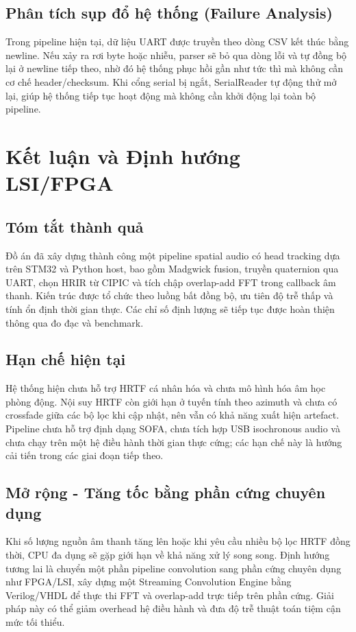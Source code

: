 \section{Phân tích sụp đổ hệ thống (Failure Analysis)}
Trong pipeline hiện tại, dữ liệu UART được truyền theo dòng CSV kết thúc bằng newline. Nếu xảy ra rơi byte hoặc nhiễu, parser sẽ bỏ qua dòng lỗi và tự đồng bộ lại ở newline tiếp theo, nhờ đó hệ thống phục hồi gần như tức thì mà không cần cơ chế header/checksum. Khi cổng serial bị ngắt, SerialReader tự động thử mở lại, giúp hệ thống tiếp tục hoạt động mà không cần khởi động lại toàn bộ pipeline.

\chapter{Kết luận và Định hướng LSI/FPGA}

\section{Tóm tắt thành quả}
Đồ án đã xây dựng thành công một pipeline spatial audio có head tracking dựa trên STM32 và Python host, bao gồm Madgwick fusion, truyền quaternion qua UART, chọn HRIR từ CIPIC và tích chập overlap-add FFT trong callback âm thanh. Kiến trúc được tổ chức theo luồng bất đồng bộ, ưu tiên độ trễ thấp và tính ổn định thời gian thực. Các chỉ số định lượng sẽ tiếp tục được hoàn thiện thông qua đo đạc và benchmark.

\section{Hạn chế hiện tại}
Hệ thống hiện chưa hỗ trợ HRTF cá nhân hóa và chưa mô hình hóa âm học phòng động. Nội suy HRTF còn giới hạn ở tuyến tính theo azimuth và chưa có crossfade giữa các bộ lọc khi cập nhật, nên vẫn có khả năng xuất hiện artefact. Pipeline chưa hỗ trợ định dạng SOFA, chưa tích hợp USB isochronous audio và chưa chạy trên một hệ điều hành thời gian thực cứng; các hạn chế này là hướng cải tiến trong các giai đoạn tiếp theo.

\section{Mở rộng - Tăng tốc bằng phần cứng chuyên dụng}
Khi số lượng nguồn âm thanh tăng lên hoặc khi yêu cầu nhiều bộ lọc HRTF đồng thời, CPU đa dụng sẽ gặp giới hạn về khả năng xử lý song song. Định hướng tương lai là chuyển một phần pipeline convolution sang phần cứng chuyên dụng như FPGA/LSI, xây dựng một Streaming Convolution Engine bằng Verilog/VHDL để thực thi FFT và overlap-add trực tiếp trên phần cứng. Giải pháp này có thể giảm overhead hệ điều hành và đưa độ trễ thuật toán tiệm cận mức tối thiểu.

